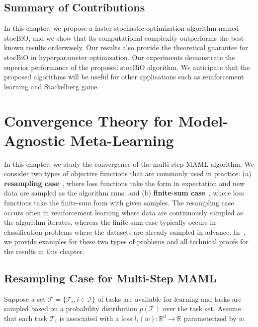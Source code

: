 \documentclass{osudissert96}
\begin{document}
\section{Summary of Contributions}
In this chapter, we propose a faster stochastic optimization algorithm named stocBiO, and we show that its computational complexity outperforms the best known results orderwisely. Our results also provide the theoretical guarantee for stocBiO in hyperparameter optimization. Our experiments demonstrate the superior performance of the proposed stocBiO algorithm.  
We anticipate that the proposed algorithms will be useful for other applications such as reinforcement learning and Stackelberg game. 

\chapter{Convergence Theory for Model-Agnostic Meta-Learning}\label{chp: maml}
%
In this chapter, we study the convergence of the multi-step MAML algorithm. We consider two types of objective functions that are commonly used in practice: (a) {\bf resampling case}~\cite{finn2017model,fallah2020convergence}, where loss functions take the form  in expectation and new data are sampled as the algorithm runs; and (b) {\bf finite-sum case}~\cite{antoniou2019train}, where loss functions take the finite-sum form with given samples. The resampling case occurs often in reinforcement learning where data are continuously sampled as the algorithm iterates, whereas the finite-sum case typically occurs in classification problems where the datasets are already sampled in advance. In~, we provide examples for these two types of problems and all technical proofs for the results in this chapter.

\section{Resampling Case for Multi-Step MAML}
Suppose a set $\mathcal{T} = \{\mathcal{T}_i, i\in \mathcal{I}\}$ of tasks are available for learning and tasks are sampled based on a probability distribution $p(\mathcal{T})$ over the task set. Assume that each task $\mathcal{T}_i$  is associated with a loss  $l_i(w): \mathbb{R}^d \rightarrow \mathbb{R}$ parameterized by $w$.
\end{document}
